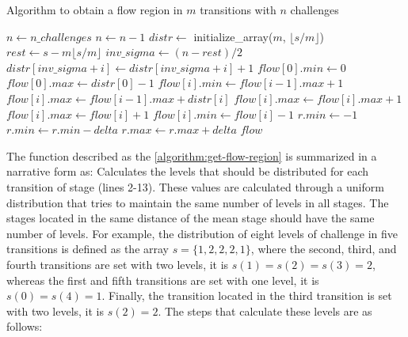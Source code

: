 \begin{algoritmo}
\caption{Algorithm to obtain a flow region in $m$ transitions with $n$ challenges}
\label{algorithm:get-flow-region}
\begin{algorithmic}[1]\small
{}
  \State $n \gets n\_challenges$%
    \State $n \gets n-1$
  \EndIf
  \State $distr \gets$ initialize\_array($m$, $\lfloor s/m \rfloor$)%
  \State $rest \gets s - m \lfloor s/m \rfloor$
    \State $inv\_sigma \gets (n-rest)/2$
      \State $distr[inv\_sigma+i] \gets distr[inv\_sigma+i]+1$
    \EndFor
  \EndIf
  \State $flow[0].min \gets 0$%
  \State $flow[0].max \gets distr[0] - 1$
    \State $flow[i].min \gets flow[i-1].max + 1$
    \State $flow[i].max \gets flow[i-1].max + distr[i]$
        \State $flow[i].max \gets flow[i].max + 1$
      \EndIf
          \State $flow[i].max \gets flow[i] + 1$
        \EndIf
          \State $flow[i].min \gets flow[i] - 1$
        \EndIf
      \EndIf
  \EndIf
  \EndFor
      \State $r.min \gets -1$
    \Else
      \State $r.min \gets r.min - delta$
      \State $r.max \gets r.max + delta$
    \EndIf
  \EndFor
  \State \Return $flow$
\EndFunction
\end{algorithmic}
\end{algoritmo}

The function  described as the \autoref{algorithm:get-flow-region} is summarized in a narrative form as:
Calculates the levels that should be distributed for each transition of stage (lines 2-13).
These values are calculated through a uniform distribution that tries to maintain the same number of levels in all stages.
The stages located in the same distance of the mean stage should have the same number of levels.
For example, the distribution of eight levels of challenge in five transitions is defined as the array $s = \{1,2,2,2,1\}$, where the second, third, and fourth transitions are set with two levels, it is $s(1) = s(2) = s(3) = 2$, whereas the first and fifth transitions are set with one level, it is $s(0) = s(4) = 1$.
Finally, the transition located in the third transition is set with two levels, it is $s(2) = 2$.
The steps that calculate these levels are as follows:

